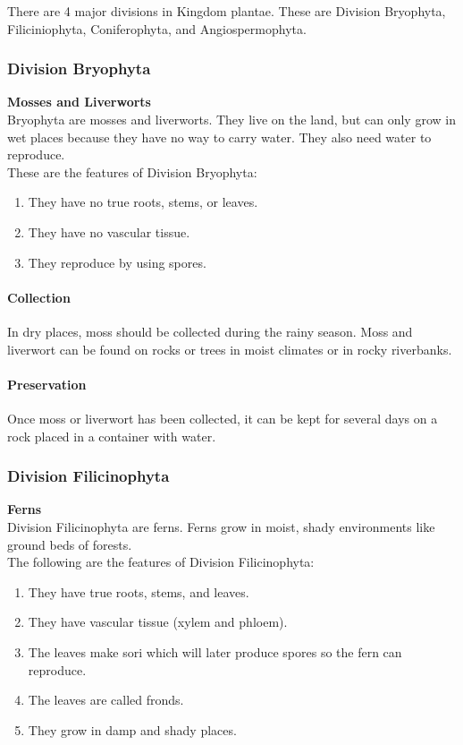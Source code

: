 There are 4 major divisions in Kingdom plantae. These are Division Bryophyta, Filiciniophyta, Coniferophyta, and Angiospermophyta.

\begin{multicols}{2}

\subsubsection{Division Bryophyta}
\textbf{Mosses and Liverworts}\\
Bryophyta are mosses and liverworts. They live on the land, but can only grow in wet places because they have no way to carry water. They also need water to reproduce.\\
These are the features of Division Bryophyta:
\begin{enumerate}
\item{They have no true roots, stems, or leaves.}
\item{They have no vascular tissue.}
\item{They reproduce by using spores.}
\end{enumerate}

\paragraph{Collection}
In dry places, moss should be collected during the rainy season. Moss and liverwort can be found on rocks or trees in moist climates or in rocky riverbanks. 

\paragraph{Preservation} 
Once moss or liverwort has been collected, it can be kept for several days on a rock placed in a container with water.

\subsubsection{Division Filicinophyta}
\textbf{Ferns}\\
Division Filicinophyta are ferns. Ferns grow in moist, shady environments like ground beds of forests. \\
The following are the features of Division Filicinophyta:
\begin{enumerate}
\item{They have true roots, stems, and leaves.}
\item{They have vascular tissue (xylem and phloem).}
\item{The leaves make sori which will later produce spores so the fern can reproduce.}
\item{The leaves are called fronds.}
\item{They grow in damp and shady places.}
\end{enumerate}


\end{multicols}
